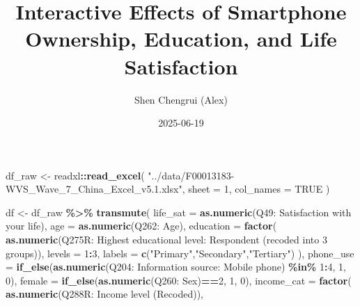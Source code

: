 \documentclass[
  11pt,
]{article}
\title{Interactive Effects of Smartphone Ownership, Education, and Life
Satisfaction}
\author{Shen Chengrui (Alex)}
\date{2025-06-19}
\newenvironment{Shaded}{\begin{snugshade}}{\end{snugshade}}
\newcommand{\AttributeTok}[1]{\textcolor[rgb]{0.13,0.29,0.53}{#1}}
\newcommand{\ConstantTok}[1]{\textcolor[rgb]{0.56,0.35,0.01}{#1}}
\newcommand{\DecValTok}[1]{\textcolor[rgb]{0.00,0.00,0.81}{#1}}
\newcommand{\FunctionTok}[1]{\textcolor[rgb]{0.13,0.29,0.53}{\textbf{#1}}}
\newcommand{\NormalTok}[1]{#1}
\newcommand{\OtherTok}[1]{\textcolor[rgb]{0.56,0.35,0.01}{#1}}
\newcommand{\SpecialCharTok}[1]{\textcolor[rgb]{0.81,0.36,0.00}{\textbf{#1}}}
\newcommand{\StringTok}[1]{\textcolor[rgb]{0.31,0.60,0.02}{#1}}
\begin{document}
\maketitle

\begin{Shaded}
\begin{Highlighting}[]
\NormalTok{df\_raw }\OtherTok{\textless{}{-}}\NormalTok{ readxl}\SpecialCharTok{::}\FunctionTok{read\_excel}\NormalTok{(}
  \StringTok{"../data/F00013183{-}WVS\_Wave\_7\_China\_Excel\_v5.1.xlsx"}\NormalTok{,   }
  \AttributeTok{sheet =} \DecValTok{1}\NormalTok{,}
  \AttributeTok{col\_names =} \ConstantTok{TRUE}
\NormalTok{)}

\NormalTok{df }\OtherTok{\textless{}{-}}\NormalTok{ df\_raw }\SpecialCharTok{\%\textgreater{}\%}
  \FunctionTok{transmute}\NormalTok{(}
    \AttributeTok{life\_sat   =} \FunctionTok{as.numeric}\NormalTok{(}\StringTok{\textasciigrave{}}\AttributeTok{Q49: Satisfaction with your life}\StringTok{\textasciigrave{}}\NormalTok{),}
    \AttributeTok{age        =} \FunctionTok{as.numeric}\NormalTok{(}\StringTok{\textasciigrave{}}\AttributeTok{Q262: Age}\StringTok{\textasciigrave{}}\NormalTok{),}
    \AttributeTok{education  =} \FunctionTok{factor}\NormalTok{(}
                   \FunctionTok{as.numeric}\NormalTok{(}\StringTok{\textasciigrave{}}\AttributeTok{Q275R: Highest educational level: Respondent (recoded into 3 groups)}\StringTok{\textasciigrave{}}\NormalTok{),}
                   \AttributeTok{levels =} \DecValTok{1}\SpecialCharTok{:}\DecValTok{3}\NormalTok{,}
                   \AttributeTok{labels =} \FunctionTok{c}\NormalTok{(}\StringTok{"Primary"}\NormalTok{,}\StringTok{"Secondary"}\NormalTok{,}\StringTok{"Tertiary"}\NormalTok{)}
\NormalTok{                 ),}
    \AttributeTok{phone\_use  =} \FunctionTok{if\_else}\NormalTok{(}\FunctionTok{as.numeric}\NormalTok{(}\StringTok{\textasciigrave{}}\AttributeTok{Q204: Information source: Mobile phone}\StringTok{\textasciigrave{}}\NormalTok{) }\SpecialCharTok{\%in\%} \DecValTok{1}\SpecialCharTok{:}\DecValTok{4}\NormalTok{, }\DecValTok{1}\NormalTok{, }\DecValTok{0}\NormalTok{),}
    \AttributeTok{female     =} \FunctionTok{if\_else}\NormalTok{(}\FunctionTok{as.numeric}\NormalTok{(}\StringTok{\textasciigrave{}}\AttributeTok{Q260: Sex}\StringTok{\textasciigrave{}}\NormalTok{)}\SpecialCharTok{==}\DecValTok{2}\NormalTok{, }\DecValTok{1}\NormalTok{, }\DecValTok{0}\NormalTok{),}
    \AttributeTok{income\_cat =} \FunctionTok{factor}\NormalTok{(}
                   \FunctionTok{as.numeric}\NormalTok{(}\StringTok{\textasciigrave{}}\AttributeTok{Q288R: Income level (Recoded)}\StringTok{\textasciigrave{}}\NormalTok{),}

\end{Highlighting}
\end{Shaded}
\end{document}
